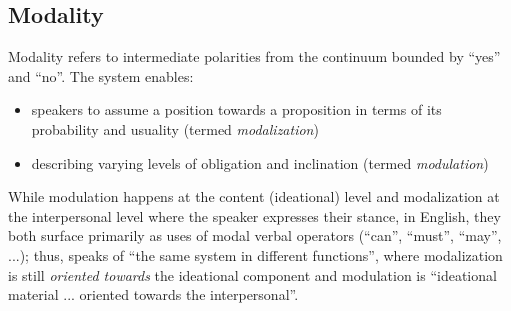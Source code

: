 \documentclass[11pt]{article}
\begin{document}
{ 	\subsection{Modality}{
 		Modality refers to intermediate polarities from the continuum bounded by ``yes'' and ``no''.
 		The system enables:
 		\begin{itemize}
 			\item speakers to assume a position towards a proposition in terms of its probability and usuality (termed \textit{modalization})
 			\item describing varying levels of obligation and inclination (termed \textit{modulation})
 		\end{itemize}
 		While modulation happens at the content (ideational) level and modalization at the interpersonal level where the speaker expresses their stance, in English, they both surface primarily as uses of modal verbal operators (``can'', ``must'', ``may'', ...); thus, \citet{Halliday1970ModalityMood} speaks of ``the same system in different functions'', where modalization is still \textit{oriented towards} the ideational component and modulation is ``ideational material ... oriented towards the interpersonal''.
		\begin{table}[h!tb]

\end{table}}}
\end{document}
